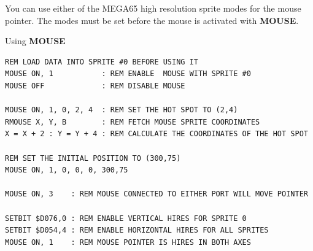\begin{description}[leftmargin=2cm,style=nextline]
                  You can use either of the MEGA65 high resolution sprite modes for the mouse pointer. The modes must be set before the mouse is activated with {\bf MOUSE}.

\item [Examples:] Using {\bf MOUSE}

\begin{tcolorbox}[colback=black,coltext=white]
\verbatimfont{\codefont}
\begin{verbatim}
REM LOAD DATA INTO SPRITE #0 BEFORE USING IT
MOUSE ON, 1           : REM ENABLE  MOUSE WITH SPRITE #0
MOUSE OFF             : REM DISABLE MOUSE

MOUSE ON, 1, 0, 2, 4  : REM SET THE HOT SPOT TO (2,4)
RMOUSE X, Y, B        : REM FETCH MOUSE SPRITE COORDINATES
X = X + 2 : Y = Y + 4 : REM CALCULATE THE COORDINATES OF THE HOT SPOT

REM SET THE INITIAL POSITION TO (300,75)
MOUSE ON, 1, 0, 0, 0, 300,75

MOUSE ON, 3    : REM MOUSE CONNECTED TO EITHER PORT WILL MOVE POINTER

SETBIT $D076,0 : REM ENABLE VERTICAL HIRES FOR SPRITE 0
SETBIT $D054,4 : REM ENABLE HORIZONTAL HIRES FOR ALL SPRITES
MOUSE ON, 1    : REM MOUSE POINTER IS HIRES IN BOTH AXES
\end{verbatim}
\end{tcolorbox}
\end{description}


\newpage
